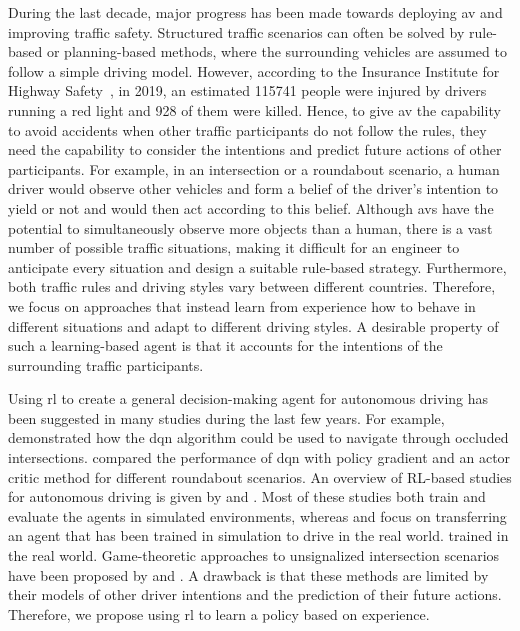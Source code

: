 During the last decade, major progress has been made towards deploying \gls{av} and improving traffic safety. 
Structured traffic scenarios can often be solved by rule-based or planning-based methods, where the surrounding vehicles are assumed to follow a simple driving model. However, according to the Insurance Institute for Highway Safety~\cite{IIHS2019}, in 2019, an estimated \num{115741} people were injured by drivers running a red light and \num{928} of them were killed. 
Hence, to give \gls{av} the capability to avoid accidents when other traffic participants do not follow the rules, they need the capability to consider the intentions and predict future actions of other participants. 
For example, in an intersection or a roundabout scenario, a human driver would observe other vehicles and form a belief of the driver's intention to yield or not and would then act according to this belief. Although \gls{av}s have the potential to simultaneously observe more objects than a human, there is a vast number of possible traffic situations, making it difficult for an engineer to anticipate every situation and design a suitable rule-based strategy. Furthermore, both traffic rules and driving styles vary between different countries. Therefore, we focus on approaches that instead learn from experience how to behave in different situations and adapt to different driving styles. A desirable property of such a learning-based agent is that it accounts for the intentions of the surrounding traffic participants.

Using \gls{rl} to create a general decision-making agent for autonomous driving has been suggested in many studies during the last few years. For example, \citet{Isele2018} demonstrated how the \gls{dqn} algorithm could be used to navigate through occluded intersections.  compared the performance of \gls{dqn} with policy gradient and an actor critic method for different roundabout scenarios. 
An overview of RL-based studies for autonomous driving is given by \citet{Ye2021} and \citet{kiran2021}.
Most of these studies both train and evaluate the agents in simulated environments, whereas \citet{Bansal2018} and \citet{Pan2017} focus on transferring an agent that has been trained in simulation to drive in the real world.  trained in the real world.
Game-theoretic approaches to unsignalized intersection scenarios have been proposed by \citet{chen2020} and \citet{li2021}. A drawback is that these methods are limited by their models of other driver intentions and the prediction of their future actions. Therefore, we propose using \gls{rl} to learn a policy based on experience. 


